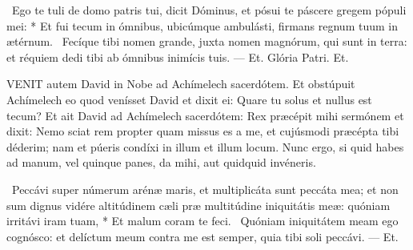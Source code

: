 \R\ Ego te tuli de domo patris tui, dicit Dóminus, et pósui te páscere gregem pópuli mei: * Et fui tecum in ómnibus, ubicúmque ambulásti, firmans regnum tuum in ætérnum. \V\ Fecíque tibi nomen grande, juxta nomen magnórum, qui sunt in terra: et réquiem dedi tibi ab ómnibus inimícis tuis. --- Et. Glória Patri. Et.




\lettrine[lines=2]{V}{ENIT} autem David in Nobe ad Achímelech sacerdótem. Et obstúpuit Achímelech eo quod venísset David et dixit ei: Quare tu solus et nullus est tecum? Et ait David ad Achímelech sacerdótem: Rex præcépit mihi sermónem et dixit: Nemo sciat rem propter quam missus es a me, et cujúsmodi præcépta tibi déderim; nam et púeris condíxi in illum et illum locum. Nunc ergo, si quid habes ad manum, vel quinque panes, da mihi, aut quidquid invéneris.

\R\ Peccávi super númerum arénæ maris, et multiplicáta sunt peccáta mea; et non sum dignus vidére altitúdinem cæli præ multitúdine iniquitátis meæ: quóniam irritávi iram tuam, * Et malum coram te feci. \V\ Quóniam iniquitátem meam ego cognósco: et delíctum meum contra me est semper, quia tibi soli peccávi. --- Et.

